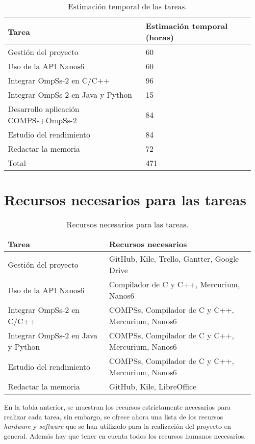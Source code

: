 \begin{table}[H]
 \centering
 \begin{tabular}{|| l | l ||}
  \hline
  Tarea & Estimación temporal (horas) 			\\
  \hline\hline
   Gestión del proyecto & 60 					\\
   \hline
   Uso de la API Nanos6 & 60 					\\
   \hline
   Integrar OmpSs-2 en C/C++ & 96 				\\
   \hline
   Integrar OmpSs-2 en Java y Python & 15 		\\
   \hline
   Desarrollo aplicación COMPSs+OmpSs-2 & 84 	\\
   \hline
   Estudio del rendimiento & 84 				\\
   \hline
   Redactar la memoria & 72 					\\
  \hline
  Total & 471 									\\
  \hline
 \end{tabular}
 \caption{Estimación temporal de las tareas.}
\end{table}

\section{Recursos necesarios para las tareas}

\begin{table}[H]
 \centering
 \begin{tabular}{| l | l |}
 \hline
 Tarea & Recursos necesarios \\
 \hline\hline  
 Gestión del proyecto & GitHub, Kile, Trello, Gantter, Google Drive \\
 \hline
 Uso de la API Nanos6 & Compilador de C y C++, Mercurium, Nanos6 \\
 \hline
 Integrar OmpSs-2 en C/C++ & COMPSs, Compilador de C y C++, Mercurium, Nanos6 \\
 \hline
 Integrar OmpSs-2 en Java y Python & COMPSs, Compilador de C y C++, Mercurium, Nanos6 \\
 \hline
 Estudio del rendimiento & COMPSs, Compilador de C y C++, Mercurium, Nanos6 \\
 \hline
 Redactar la memoria & GitHub, Kile, LibreOffice \\
 \hline
 \end{tabular}
 \caption{Recursos necesarios para las tareas.}
\end{table}

En la tabla anterior, se muestran los recursos estrictamente necesarios para realizar cada tarea, sin embargo, se ofrece ahora una lista de los recursos \textit{hardware} y \textit{software} que se han utilizado para la realización del proyecto en general. Además hay que tener en cuenta todos los recursos humanos necesarios.

